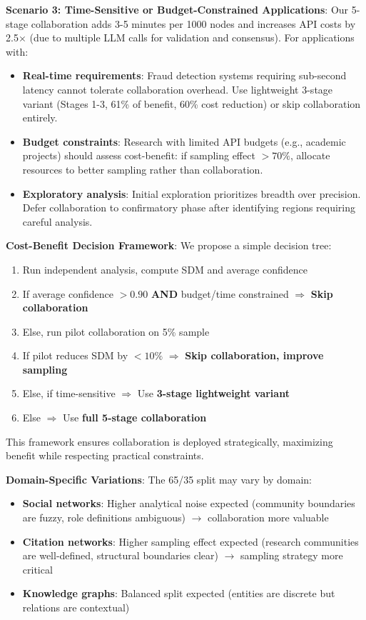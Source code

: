 \documentclass[conference]{IEEEtran}
\begin{document}
\textbf{Scenario 3: Time-Sensitive or Budget-Constrained Applications}: Our 5-stage collaboration adds 3-5 minutes per 1000 nodes and increases API costs by 2.5$\times$ (due to multiple LLM calls for validation and consensus). For applications with:
\begin{itemize}
    \item \textbf{Real-time requirements}: Fraud detection systems requiring sub-second latency cannot tolerate collaboration overhead. Use lightweight 3-stage variant (Stages 1-3, 61\% of benefit, 60\% cost reduction) or skip collaboration entirely.
    \item \textbf{Budget constraints}: Research with limited API budgets (e.g., academic projects) should assess cost-benefit: if sampling effect $> 70\%$, allocate resources to better sampling rather than collaboration.
    \item \textbf{Exploratory analysis}: Initial exploration prioritizes breadth over precision. Defer collaboration to confirmatory phase after identifying regions requiring careful analysis.
\end{itemize}

\textbf{Cost-Benefit Decision Framework}: We propose a simple decision tree:
\begin{enumerate}
    \item Run independent analysis, compute SDM and average confidence
    \item If average confidence $> 0.90$ \textbf{AND} budget/time constrained $\Rightarrow$ \textbf{Skip collaboration}
    \item Else, run pilot collaboration on 5\% sample
    \item If pilot reduces SDM by $< 10\%$ $\Rightarrow$ \textbf{Skip collaboration, improve sampling}
    \item Else, if time-sensitive $\Rightarrow$ Use \textbf{3-stage lightweight variant}
    \item Else $\Rightarrow$ Use \textbf{full 5-stage collaboration}
\end{enumerate}

This framework ensures collaboration is deployed strategically, maximizing benefit while respecting practical constraints.

\textbf{Domain-Specific Variations}: The 65/35 split may vary by domain:
\begin{itemize}
    \item \textbf{Social networks}: Higher analytical noise expected (community boundaries are fuzzy, role definitions ambiguous) $\rightarrow$ collaboration more valuable
    \item \textbf{Citation networks}: Higher sampling effect expected (research communities are well-defined, structural boundaries clear) $\rightarrow$ sampling strategy more critical
    \item \textbf{Knowledge graphs}: Balanced split expected (entities are discrete but relations are contextual)
\end{itemize}
\end{document}
